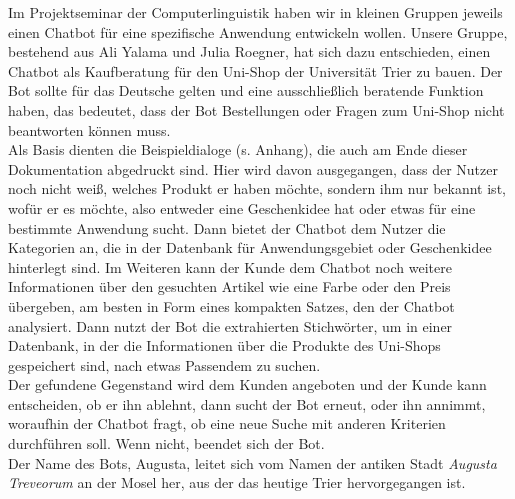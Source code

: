 Im Projektseminar der Computerlinguistik haben wir in kleinen Gruppen jeweils einen Chatbot für eine spezifische Anwendung entwickeln wollen. Unsere Gruppe, bestehend aus Ali Yalama und Julia Roegner, hat sich dazu entschieden, einen Chatbot als Kaufberatung für den Uni-Shop der Universität Trier zu bauen. Der Bot sollte für das Deutsche gelten und eine ausschließlich beratende Funktion haben, das bedeutet, dass der Bot Bestellungen oder Fragen zum Uni-Shop nicht beantworten können muss.\\
Als Basis dienten die Beispieldialoge (s. Anhang), die auch am Ende dieser Dokumentation abgedruckt sind. Hier wird davon ausgegangen, dass der Nutzer noch nicht weiß, welches Produkt er haben möchte, sondern ihm nur bekannt ist, wofür er es möchte, also entweder eine Geschenkidee hat oder etwas für eine bestimmte Anwendung sucht. Dann bietet der Chatbot dem Nutzer die Kategorien an, die in der Datenbank für Anwendungsgebiet oder Geschenkidee hinterlegt sind. Im Weiteren kann der Kunde dem Chatbot noch weitere Informationen über den gesuchten Artikel wie eine Farbe oder den Preis übergeben, am besten in Form eines kompakten Satzes, den der Chatbot analysiert. Dann nutzt der Bot die extrahierten Stichwörter, um in einer Datenbank, in der die Informationen über die Produkte des Uni-Shops gespeichert sind, nach etwas Passendem zu suchen.\\
Der gefundene Gegenstand wird dem Kunden angeboten und der Kunde kann entscheiden, ob er ihn ablehnt, dann sucht der Bot erneut, oder ihn annimmt, woraufhin der Chatbot fragt, ob eine neue Suche mit anderen Kriterien durchführen soll. Wenn nicht, beendet sich der Bot.\\
Der Name des Bots, Augusta, leitet sich vom Namen der antiken Stadt \textit{Augusta Treveorum} an der Mosel her, aus der das heutige Trier hervorgegangen ist.\\



